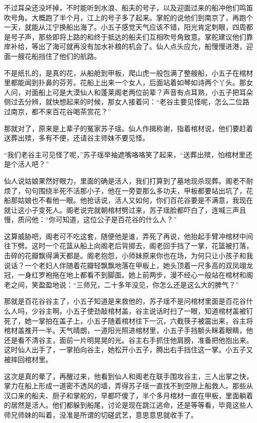不过耳朵还没坏掉，不时能听到水浪、船夫的号子，以及迎面过来的船冲他们鸣笛吹号角。大概跑了半个月，江上的号子多了起来。掌舵的说他们到南京了，再跑个一天，就能从江宁换船出海了。小五子感觉天气应该不错，阳光肯定刺眼，四周都是号子声，那些即将上路的和终于抵达的船夫们互相吹号角致意。掌舵建议他们靠岸补给，等出了海可就再没有加水补粮的机会了。仙人点头应允，船慢慢进港，迎面一艘花船挡住了他们的航路。

不是纸扎的，是真的花，从船舱到甲板，爬山虎一般包满了整艘船，小五子在棺材里都能闻到扑鼻的芬芳。花船上出来一个女人，后面站着如琴如诗两个丫头。那女人问，对面船上可是大漠仙人和蓬莱阁老两位前辈？声音有点耳熟，小五子把耳朵侧过去分辨，就快想起来的时候，那女人接着问：“老谷主要见怪呢，怎么二位路过南京，都不来百花谷喝茶赏花？”

那就对了，原来是上辈子的冤家苏子瑶。仙人作揖称谢，指着棺材说，他们要赶着送葬出殡，多有不便，还请谷主师妹不要见怪。

“我们老谷主可见怪了呢，”苏子瑶举袖遮嘴咯咯笑了起来，“送葬出殡，怕棺材里还是个活人吧？”

仙人说姑娘果然好眼力，里面的确是活人，我们打算到了墓地现杀现葬。阁老不耐烦了，句句围绕半死不活那小子，他在一旁耍那么多功夫，甲板都要站出坑了，花船那姑娘也不看他一眼。他抢话说，活人又如何，你们百花谷要是不满意，我现在就让这小子变死人。阁老说完就朝棺材劈过来，苏子瑶脸都吓白了，连喊三声且慢，质问他：“你可知道，这位公子是百花谷的什么人？”

这算威胁吧，阁老可不吃这套，随便他是谁，弄死了再说，他抬起手臂冲棺材中间往下劈。这时一个花篮从船上向阁老后背掷去，阁老回手挡了一掌，花篮被打落，击碎的花瓣飘得满天都是。阁老抱怨，小师妹原来你也在场，为何只让小孩子和我说话？一个老妇人伴随着花瓣轻飘飘地落在甲板上，她头顶着一尺多高的双凤翊龙冠，一身红罗袍拖在地上都看不到脚面。她上前两步，漫不经心一般站在棺材和阁老之间，笑盈盈地说：“三师兄，二十多年没见，你怎么还是这么大的脾气？”

那就是百花谷谷主了，小五子知道是来救他的，苏子瑶不是问棺材里面是百花谷什么人吗，少谷主啊。小五子使劲敲棺材盖，谷主说话时扫了一眼，知道棺材盖被钉
死了，她一掌拍在盖子上，小五子随着棺材往下一沉，六截筷子被震出来，谷主将棺材盖推开一半。天气晴朗，一道阳光照进棺材里，小五子手挡额头眯着眼睛，他还是看不清谷主，面前一片明晃晃的光。谷主右手抓住他肩膀，准备把他抱出来。这时仙人出手了，一掌拍向谷主，她松开小五子，腾出右手挡住这一掌。小五子又被摔回棺材里。

这次是真的晕了，再醒过来，他看到仙人和阁老在联手围攻谷主，三人出掌之快，掌力在船上形成一道密不透风的墙，弄得苏子瑶一直找不到空隙上船救人。那些从汉口来的船夫、厨子和掌舵的，早都吓傻了，半个多月棺材一直在甲板，里面躺着的居然是活人。他们都躲到船尾，讨论是现在跳江逃命，还是等等看，毕竟这些人师兄师妹的叫着，没准是所谓的切磋武艺，意思意思就收手了。

